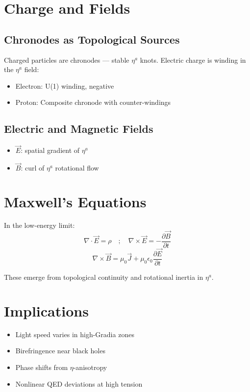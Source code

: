 \documentclass[12pt]{article}
\begin{document}
\section{Charge and Fields}

\subsection{Chronodes as Topological Sources}

Charged particles are chronodes — stable $\eta^a$ knots. Electric charge is winding in the $\eta^a$ field:
\begin{itemize}
\item Electron: U(1) winding, negative
\item Proton: Composite chronode with counter-windings
\end{itemize}

\subsection{Electric and Magnetic Fields}

\begin{itemize}
\item $\vec{E}$: spatial gradient of $\eta^a$
\item $\vec{B}$: curl of $\eta^a$ rotational flow
\end{itemize}

\section{Maxwell's Equations}

In the low-energy limit:
\[
\nabla \cdot \vec{E} = \rho \quad ; \quad \nabla \times \vec{E} = -\frac{\partial \vec{B}}{\partial t}
\]
\[
\nabla \times \vec{B} = \mu_0 \vec{J} + \mu_0 \epsilon_0 \frac{\partial \vec{E}}{\partial t}
\]

These emerge from topological continuity and rotational inertia in $\eta^a$.

\section{Implications}

\begin{itemize}
\item Light speed varies in high-Gradia zones
\item Birefringence near black holes
\item Phase shifts from $\eta$-anisotropy
\item Nonlinear QED deviations at high tension
\end{itemize}
\end{document}
